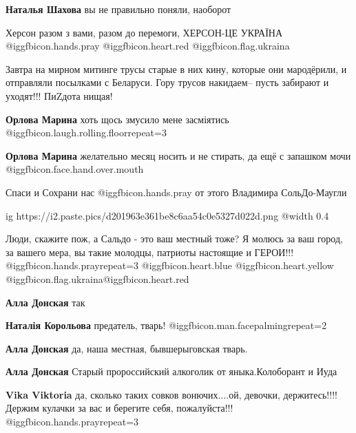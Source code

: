 \begin{itemize}
\begin{itemize}
\textbf{Наталья Шахова} вы не правильно поняли, наоборот
\end{itemize} %


Херсон разом з вами, разом до перемоги, ХЕРСОН-ЦЕ УКРАЇНА
@igg{fbicon.hands.pray}  @igg{fbicon.heart.red} @igg{fbicon.flag.ukraina}


Завтра на мирном митинге трусы старые в них кину, которые они мародёрили, и
отправляли посылками с Беларуси. Гору трусов накидаем– пусть забирают и
уходят!!! ПиZдота нищая!

\begin{itemize} %
\textbf{Орлова Марина} хоть щось змусило мене засміятись  @igg{fbicon.laugh.rolling.floor}{repeat=3} 

\textbf{Орлова Марина} желательно месяц носить и не стирать, да ещё с запашком мочи @igg{fbicon.face.hand.over.mouth} 

Спаси и Сохрани нас @igg{fbicon.hands.pray}  от этого Владимира СольДо-Маугли

\ifcmt
  ig https://i2.paste.pics/d201963e361be8c6aa54c0e5327d022d.png
  @width 0.4
\fi

\end{itemize} %


Люди, скажите пож, а Сальдо - это ваш местный тоже? Я молюсь за ваш город, за
вашего мера, вы такие молодцы, патриоты настоящие и ГЕРОИ!!! @igg{fbicon.hands.pray}{repeat=3}  @igg{fbicon.heart.blue}  @igg{fbicon.heart.yellow} @igg{fbicon.flag.ukraina}@igg{fbicon.heart.red}

\begin{itemize} %
\textbf{Алла Донская} так

\textbf{Наталія Корольова} предатель, тварь! @igg{fbicon.man.facepalming}{repeat=2} 

\textbf{Алла Донская} да, наша местная, бывшерыговская тварь.

\textbf{Алла Донская} Старый пророссийский алкоголик от яныка.Колоборант и Иуда

\textbf{Vika Viktoria} да, сколько таких совков вонючих....ой, девочки, держитесь!!!! Держим кулачки за вас и берегите себя, пожалуйста!!! @igg{fbicon.hands.pray}{repeat=3} 


\end{itemize}
\end{itemize}
